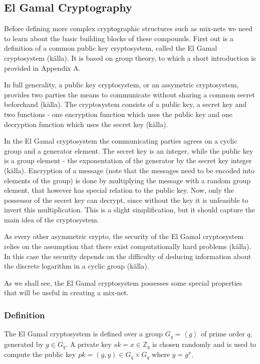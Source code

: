 \subsection{El Gamal Cryptography}

Before defining more complex cryptographic structures such as mix-nets
we need to learn about the basic building blocks of these
compounds. First out is a definition of a common public key
cryptosystem, called the El Gamal cryptosystem (källa). It is based on
group theory, to which a short introduction is provided in Appendix A.

In full generality, a public key cryptosystem, or an assymetric
cryptosystem, provides two parties the means to communicate without
sharing a common secret beforehand (källa). The cryptosystem consists
of a public key, a secret key and two functions - one encryption
function which uses the public key and one decryption function which
uses the secret key (källa).

In the El Gamal cryptosystem the communicating parties agrees on a
cyclic group and a generator element. The secret key is an integer,
while the public key is a group element - the exponentation of the
generator by the secret key integer (källa). Encryption of a message
(note that the messages need to be encoded into elements of the group)
is done by multiplying the message with a random group element, that
however has special relation to the public key. Now, only the
possessor of the secret key can decrypt, since without the key it is
unfeasible to invert this multiplication. This is a slight
simplification, but it should capture the main idea of the
cryptosystem.

As every other asymmetric crypto, the security of the El Gamal
cryptosystem relies on the assumption that there exist computationally
hard problems (källa). In this case the security depends on the
difficulty of deducing information about the discrete logarithm in a
cyclic group (källa).

As we shall see, the El Gamal cryptosystem possesses some special
properties that will be useful in creating a mix-net.

\subsubsection{Definition}
The El Gamal cryptosystem is defined over a group $G_q =
\left<g\right>$ of prime order $q$, generated by $g \in G_q$. A
private key $sk = x \in \mathbb{Z}_q$ is chosen randomly and is used
to compute the public key $pk = (g,y) \in G_q \times G_q$ where $y =
g^x$.

